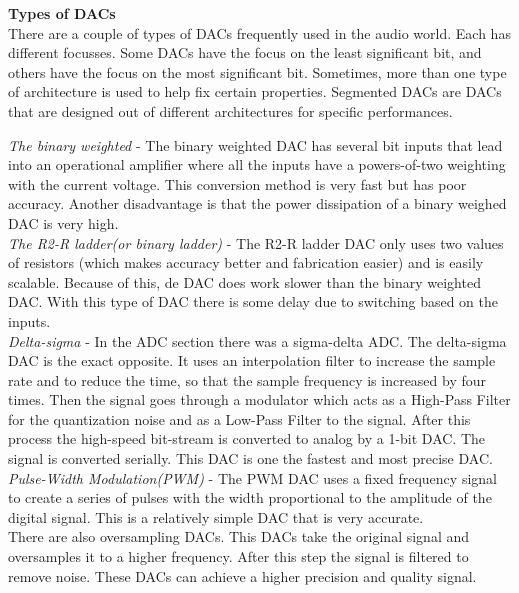         \textbf{Types of DACs}\\
        There are a couple of types of DACs frequently used in the audio world. Each has different focusses. Some DACs have the focus on the least significant bit, and others have the focus on the most significant bit. Sometimes, more than one type of architecture is used to help fix certain properties. Segmented DACs are DACs that are designed out of different architectures for specific performances. 

        \textit{The binary weighted} - The binary weighted DAC has several bit inputs that lead into an operational amplifier where all the inputs have a powers-of-two weighting with the current voltage. This conversion method is very fast but has poor accuracy. Another disadvantage is that the power dissipation of a binary weighed DAC is very high. \\

        \textit{The R2-R ladder(or binary ladder)} - The R2-R ladder DAC only uses two values of resistors (which makes accuracy better and fabrication easier) and is easily scalable. Because of this, de DAC does work slower than the binary weighted DAC. With this type of DAC there is some delay due to switching based on the inputs.\\

        \textit{Delta-sigma} - In the ADC section there was a sigma-delta ADC. The delta-sigma DAC is the exact opposite. It uses an interpolation filter to increase the sample rate and to reduce the time, so that the sample frequency is increased by four times. Then the signal goes through a modulator which acts as a High-Pass Filter for the quantization noise and as a Low-Pass Filter to the signal. After this process the high-speed bit-stream is converted to analog by a 1-bit DAC. The signal is converted serially.
        This DAC is one the fastest and most precise DAC.\\

        \textit{Pulse-Width Modulation(PWM)} - The PWM DAC uses a fixed frequency signal to create a series of pulses with the width proportional to the amplitude of the digital signal. This is a relatively simple DAC that is very accurate.\\

        There are also oversampling DACs. This DACs take the original signal and oversamples it to a higher frequency. After this step the signal is filtered to remove noise. These DACs can achieve a higher precision and quality signal. \\

